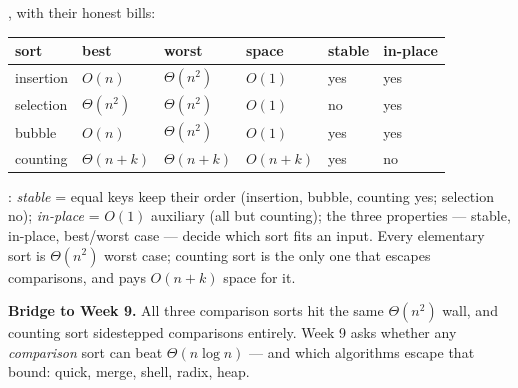 \documentclass[11pt]{article}
\begin{document}
, with their honest bills:

\begin{center}
{\footnotesize
\begin{tabular}{llllll}
  \toprule
  \textbf{sort} & \textbf{best} & \textbf{worst} & \textbf{space} &
    \textbf{stable} & \textbf{in-place} \\
  \midrule
  insertion & $O(n)$ & $\Theta(n^2)$ & $O(1)$ & yes & yes \\
  selection & $\Theta(n^2)$ & $\Theta(n^2)$ & $O(1)$ & no & yes \\
  bubble & $O(n)$ & $\Theta(n^2)$ & $O(1)$ & yes & yes \\
  counting & $\Theta(n+k)$ & $\Theta(n+k)$ & $O(n+k)$ & yes & no \\
  \bottomrule
\end{tabular}}
\end{center}

: \emph{stable} = equal keys keep their order (insertion, bubble, counting yes; selection no); \emph{in-place} = $O(1)$ auxiliary (all but counting); the three properties --- stable, in-place, best/worst case --- decide which sort fits an input. Every elementary sort is $\Theta(n^2)$ worst case; counting sort is the only one that escapes comparisons, and pays $O(n+k)$ space for it.

\textbf{Bridge to Week 9.} All three comparison sorts hit the same $\Theta(n^2)$ wall, and counting sort sidestepped comparisons entirely. Week 9 asks whether any \emph{comparison} sort can beat $\Theta(n \log n)$ --- and which algorithms escape that bound: quick, merge, shell, radix, heap.
\end{document}
